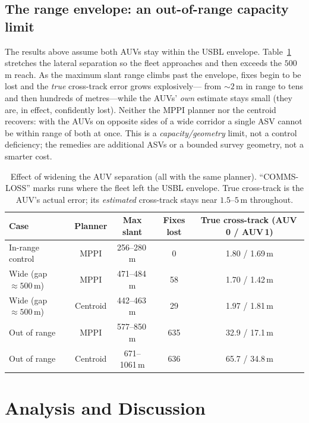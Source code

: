 \documentclass[12pt,a4paper,oneside]{book}
\newcommand{\tabref}[1]{Table~\ref{#1}}
\begin{document}
\section{The range envelope: an out-of-range capacity limit}
\label{sec:outofrange}
The results above assume both AUVs stay within the USBL envelope. \tabref{tab:outofrange} stretches the
lateral separation so the fleet approaches and then exceeds the $500$\,m reach. As the maximum slant range
climbs past the envelope, fixes begin to be lost and the \emph{true} cross-track error grows explosively---
from $\sim2$\,m in range to tens and then hundreds of metres---while the AUVs' \emph{own} estimate stays
small (they are, in effect, confidently lost). Neither the MPPI planner nor the centroid recovers: with the
AUVs on opposite sides of a wide corridor a single ASV cannot be within range of both at once. This is a
\emph{capacity/geometry} limit, not a control deficiency; the remedies are additional ASVs or a bounded
survey geometry, not a smarter cost.

\begin{table}[H]
\centering
\caption{Effect of widening the AUV separation (all with the same planner). ``COMMS-LOSS'' marks runs where
the fleet left the USBL envelope. True cross-track is the AUV's actual error; its \emph{estimated}
cross-track stays near $1.5$--$5$\,m throughout.}
\label{tab:outofrange}
\begin{tabular}{@{}lcccc@{}}
\toprule
Case & Planner & Max slant & Fixes lost & True cross-track (AUV\,0 / AUV\,1) \\
\midrule
In-range control      & MPPI     & 256--280\,m & 0   & 1.80 / 1.69\,m \\
Wide (gap $\approx500$\,m) & MPPI     & 471--484\,m & 58  & 1.70 / 1.42\,m \\
Wide (gap $\approx500$\,m) & Centroid & 442--463\,m & 29  & 1.97 / 1.81\,m \\
Out of range          & MPPI     & 577--850\,m & 635 & 32.9 / 17.1\,m \\
Out of range          & Centroid & 671--1061\,m & 636 & 65.7 / 34.8\,m \\
\bottomrule
\end{tabular}
\end{table}

\chapter{Analysis and Discussion}
\label{ch:analysis}
\end{document}
